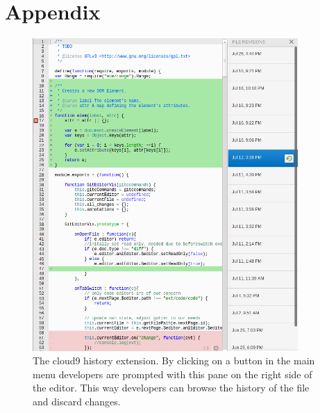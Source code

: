 \section{Appendix}
\label{sec:Appendix}

\begin{figure}
   \centering
   \includegraphics[width=0.9\textwidth]{images/extension_history.png}
   \caption{The cloud9 history extension. By clicking on a button in the main menu developers are prompted with this pane on the right side of the editor. This way developers can browse the history of the file and discard changes.}
   \label{fig:history}
\end{figure}